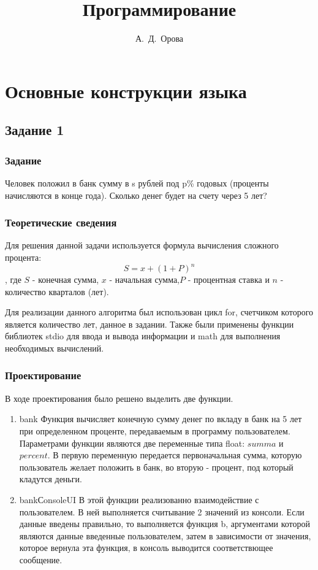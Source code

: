 \documentclass[12pt,a4paper]{report}
\author{А.~Д.~Орова}
\title{Программирование}
\begin{document}
\maketitle
\chapter{Основные конструкции языка}
\section{Задание 1}
\subsection{Задание}
Человек положил в банк сумму в s рублей под p\% годовых (проценты начисляются в конце года). Сколько денег будет на счету через 5 лет? 
\subsection{Теоретические сведения}

Для решения данной задачи используется формула вычисления сложного процента: \begin{displaymath} S = x + (1 + P)^{n}  \end{displaymath}, где $S$ - конечная сумма, $x$ - начальная сумма,$P$ - процентная ставка и $n$ - количество кварталов (лет).

Для реализации данного алгоритма был использован цикл for, счетчиком которого является количество лет, данное в задании. Также были применены функции библиотек stdio для ввода и вывода информации и math для выполнения необходимых вычислений.


\subsection{Проектирование}
В ходе проектирования было решено выделить две функции.
	\begin{enumerate}
		\item bank
		 Функция вычисляет конечную сумму денег по вкладу в банк на 5 лет при определенном проценте, передаваемым в программу пользователем.
		 Параметрами функции являются две переменные типа float: $summa$ и $percent$. В первую переменную передается первоначальная сумма, которую пользователь желает положить в банк, во вторую - процент, под который кладутся деньги.	 
		\item bankСonsoleUI 
		 В этой функции реализованно взаимодействие с пользователем. В ней выполняется считывание 2 значений из консоли. Если данные введены правильно, то выполняется функция b, аргументами которой являются данные введенные пользователем, затем в зависимости от значения, которое вернула эта функция, в  консоль выводится соответствющее сообщение. 		
	\end{enumerate}
\end{document}
